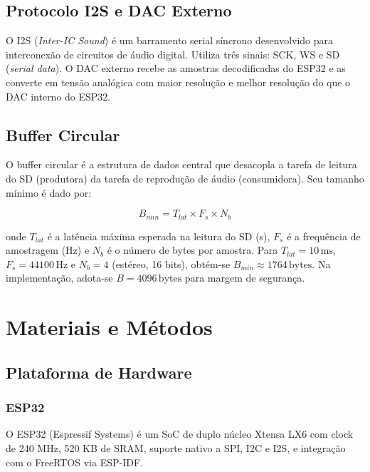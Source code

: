 \documentclass[conference]{IEEEtran}
\begin{document}
\subsection{Protocolo I2S e DAC Externo}

O I2S (\textit{Inter-IC Sound}) é um barramento serial síncrono desenvolvido
para interconexão de circuitos de áudio digital. Utiliza três
sinais: SCK, WS e
SD (\textit{serial data}). O DAC externo recebe as amostras decodificadas do ESP32 e as converte
em tensão analógica com maior resolução e melhor resolução do que o DAC interno do ESP32.

\subsection{Buffer Circular}

O buffer circular é a estrutura de dados central que desacopla a tarefa de
leitura do SD (produtora) da tarefa de reprodução de áudio (consumidora). Seu
tamanho mínimo é dado por:

\begin{equation}
    B_{min} = T_{lat} \times F_s \times N_b
    \label{eq_buffer}
\end{equation}

onde $T_{lat}$ é a latência máxima esperada na leitura do SD (s), $F_s$ é a
frequência de amostragem (Hz) e $N_b$ é o número de bytes por amostra. Para
$T_{lat} = 10\,\text{ms}$, $F_s = 44100\,\text{Hz}$ e $N_b = 4$
(estéreo, 16 bits), obtém-se $B_{min} \approx 1764\,\text{bytes}$. Na
implementação, adota-se $B = 4096\,\text{bytes}$ para margem de segurança.

\section{Materiais e Métodos}

\subsection{Plataforma de Hardware}

\subsubsection{ESP32}
O ESP32 (Espressif Systems) é um SoC de duplo núcleo Xtensa LX6 com clock de 240 MHz, 520 KB de SRAM, suporte nativo a SPI, I2C e I2S,
e integração com o FreeRTOS via ESP-IDF.
\end{document}
